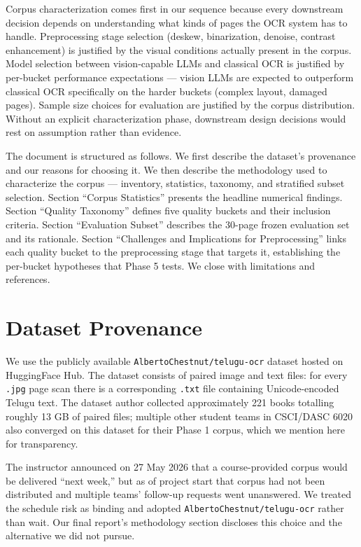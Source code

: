 \documentclass[
  letterpaper,
  DIV=11,
  numbers=noendperiod]{scrartcl}
\begin{document}
Corpus characterization comes first in our sequence because every
downstream decision depends on understanding what kinds of pages the OCR
system has to handle. Preprocessing stage selection (deskew,
binarization, denoise, contrast enhancement) is justified by the visual
conditions actually present in the corpus. Model selection between
vision-capable LLMs and classical OCR is justified by per-bucket
performance expectations --- vision LLMs are expected to outperform
classical OCR specifically on the harder buckets (complex layout,
damaged pages). Sample size choices for evaluation are justified by the
corpus distribution. Without an explicit characterization phase,
downstream design decisions would rest on assumption rather than
evidence.

The document is structured as follows. We first describe the dataset's
provenance and our reasons for choosing it. We then describe the
methodology used to characterize the corpus --- inventory, statistics,
taxonomy, and stratified subset selection. Section ``Corpus Statistics''
presents the headline numerical findings. Section ``Quality Taxonomy''
defines five quality buckets and their inclusion criteria. Section
``Evaluation Subset'' describes the 30-page frozen evaluation set and
its rationale. Section ``Challenges and Implications for Preprocessing''
links each quality bucket to the preprocessing stage that targets it,
establishing the per-bucket hypotheses that Phase 5 tests. We close with
limitations and references.

\section{Dataset Provenance}\label{dataset-provenance}

We use the publicly available \texttt{AlbertoChestnut/telugu-ocr}
dataset hosted on HuggingFace Hub. The dataset consists of paired image
and text files: for every \texttt{.jpg} page scan there is a
corresponding \texttt{.txt} file containing Unicode-encoded Telugu text.
The dataset author collected approximately 221 books totalling roughly
13 GB of paired files; multiple other student teams in CSCI/DASC 6020
also converged on this dataset for their Phase 1 corpus, which we
mention here for transparency.

The instructor announced on 27 May 2026 that a course-provided corpus
would be delivered ``next week,'' but as of project start that corpus
had not been distributed and multiple teams' follow-up requests went
unanswered. We treated the schedule risk as binding and adopted
\texttt{AlbertoChestnut/telugu-ocr} rather than wait. Our final report's
methodology section discloses this choice and the alternative we did not
pursue.
\end{document}
